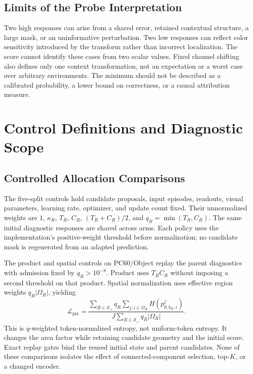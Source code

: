 \subsection{Limits of the Probe Interpretation}
Two high responses can arise from a shared error, retained contextual structure, a large mask, or an uninformative perturbation. Two low responses can reflect color sensitivity introduced by the transform rather than incorrect localization. The score cannot identify these cases from two scalar values. Fixed channel shifting also defines only one context transformation, not an expectation or a worst case over arbitrary environments. The minimum should not be described as a calibrated probability, a lower bound on correctness, or a causal attribution measure.

\section{Control Definitions and Diagnostic Scope}
\label{app:mechanism}
\subsection{Controlled Allocation Comparisons}
The five-split controls hold candidate proposals, input episodes, readouts, visual parameters, learning rate, optimizer, and update count fixed. Their unnormalized weights are $1$, $\kappa_R$, $T_R$, $C_R$, $(T_R+C_R)/2$, and $q_R=\min(T_R,C_R)$. The same initial diagnostic responses are shared across arms. Each policy uses the implementation's positive-weight threshold before normalization; no candidate mask is regenerated from an adapted prediction.



The product and spatial controls on PC60/Object replay the parent diagnostics with admission fixed by $q_R>10^{-8}$. Product uses $T_RC_R$ without imposing a second threshold on that product. Spatial normalization uses effective region weights $q_R|\Omega_R|$, yielding
\begin{equation}
\mathcal L_{\mathrm{pix}}=
\frac{\sum_{R\in\mathcal S_+}q_R\sum_{j,i\in\Omega_R}H(p^j_{\theta,b_R,i})}
{J\sum_{R\in\mathcal S_+}q_R|\Omega_R|}.
\end{equation}
This is $q$-weighted token-normalized entropy, not uniform-token entropy. It changes the area factor while retaining candidate geometry and the initial score. Exact replay gates bind the reused initial state and parent candidates. None of these comparisons isolates the effect of connected-component selection, top-$K$, or a changed encoder.

